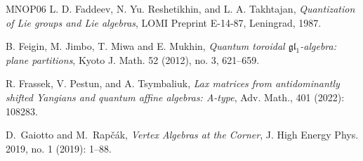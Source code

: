 \documentclass[10pt]{amsart}
\theoremstyle{definition}
\numberwithin{equation}{section}
\begin{document}
\begin{thebibliography}{MNOP06}
 L. D. Faddeev, N. Yu. Reshetikhin, and L. A. Takhtajan, \textit{Quantization of Lie groups and Lie algebras}, LOMI Preprint E-14-87, Leningrad, 1987.


B. Feigin, M. Jimbo, T. Miwa and E. Mukhin, \textit{Quantum toroidal $\mathfrak{g}{{\mathfrak{l}}_{1}}$-algebra: plane partitions}, Kyoto J. Math. 52 (2012), no. 3, 621--659.






 R. Frassek, V. Pestun, and A. Tsymbaliuk, \textit{Lax matrices from antidominantly shifted Yangians and quantum affine algebras: A-type}, Adv. Math., 401 (2022): 108283.









D.~Gaiotto and M.~Rap\v{c}\'ak, \textit{Vertex Algebras at the Corner}, 
J. High Energy Phys. 2019, no. 1 (2019): 1--88.


\end{thebibliography}
\end{document}
